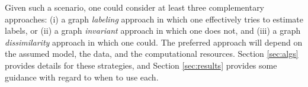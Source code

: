 \documentclass[10pt,journal,cspaper,compsoc]{IEEEtran}
\begin{document}
% 
% 
% 
% 
% 
% 
% 
Given such a scenario, one could consider at least three complementary approaches: (i) a graph \emph{labeling} approach in which one effectively tries to estimate labels, or (ii) a graph \emph{invariant} approach in which one does not, and (iii) a graph \emph{dissimilarity} approach in which one could.
The preferred approach will depend on the assumed model, the data, and the computational resources. Section \ref{sec:algs} provides details for these strategies, and Section \ref{sec:results} provides some guidance with regard to when to use each.







% 
% 
\end{document}
